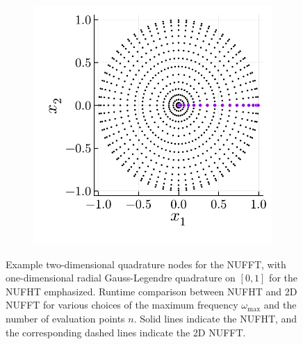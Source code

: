 \begin{figure}
  \centering
  \begin{subfigure}[b]{0.38\textwidth}
    \includegraphics[height=\textwidth]{./figures/quadrature_2D.pdf}
  \end{subfigure}
  \begin{subfigure}[b]{0.60\textwidth}
  \end{subfigure}
  \caption{Example two-dimensional quadrature nodes for the NUFFT, with
  one-dimensional radial Gauss-Legendre quadrature on $[0,1]$ for the NUFHT
  emphasized. Runtime comparison between NUFHT and 2D NUFFT for various choices
  of the maximum frequency $\omega_{\text{max}}$ and the number of  evaluation
  points $n$. Solid lines indicate the NUFHT, and the corresponding dashed lines
  indicate the 2D NUFFT.}
  \label{fig:fourier-test}
\end{figure}


